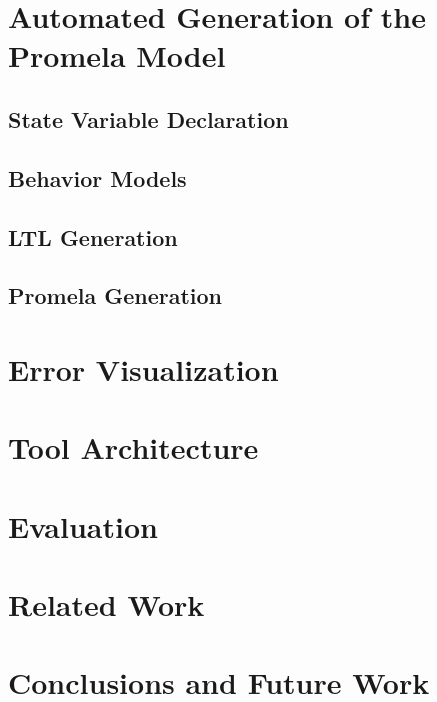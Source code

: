 \documentclass[conference]{IEEEtran}
\begin{document}
\section{Automated Generation of the Promela Model}
\label{sec:automatedGeneration}


\subsection{State Variable Declaration}
\label{sec:objectStateDefinition}


\subsection{Behavior Models}
\label{sec:behaviorModels}


\subsection{LTL Generation}
\label{sec:ltlGeneration}


\subsection{Promela Generation}
\label{sec:promelaGeneration}


\section{Error Visualization}
\label{sec:counterexample}


\section{Tool Architecture}
\label{sec:toolArchitecture}


\section{Evaluation}
\label{sec:eval}


\section{Related Work}


\section{Conclusions and Future Work}

\end{document}
